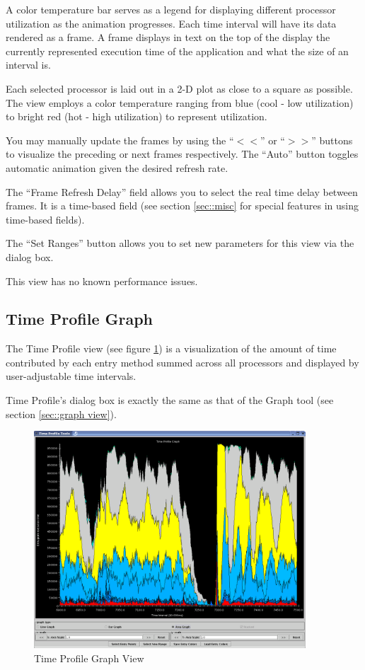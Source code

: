 \documentclass[10pt]{report}
\begin{document}
A color temperature bar serves as a legend for displaying different
processor utilization as the animation progresses. Each time interval
will have its data rendered as a frame. A frame displays in text on
the top of the display the currently represented execution time of the
application and what the size of an interval is.

Each selected processor is laid out in a 2-D plot as close to a square
as possible. The view employs a color temperature ranging from blue
(cool - low utilization) to bright red (hot - high utilization) to
represent utilization.

You may manually update the frames by using the ``$<<$'' or ``$>>$''
buttons to visualize the preceding or next frames respectively. The
``Auto'' button toggles automatic animation given the desired refresh
rate.

The ``Frame Refresh Delay'' field allows you to select the real time
delay between frames. It is a time-based field (see section
\ref{sec::misc} for special features in using time-based
fields).

The ``Set Ranges'' button allows you to set new parameters for this
view via the dialog box.

This view has no known performance issues.

\subsection{Time Profile Graph}

The Time Profile view (see figure \ref{time profile}) is a
visualization of the amount of time contributed by each entry method
summed across all processors and displayed by user-adjustable time
intervals.

Time Profile's dialog box is exactly the same as that of the Graph
tool (see section \ref{sec::graph view}).

\begin{figure}[htb]
\center
\includegraphics[width=4.0in]{fig/timeprofile}
\caption{Time Profile Graph View}
\label{time profile}
\end{figure}
\end{document}
